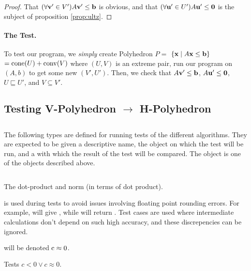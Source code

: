 \begin{proof}
That $(\forall \mathbf{v}'\in V')A\mathbf{v}'\leq\mathbf{b}$ is obvious, and that $(\forall\mathbf{u}'\in U') A\mathbf{u}'\leq\mathbf{0}$ is the subject of proposition \ref{prop:ultz}.
\end{proof}

\paragraph{The Test.}  To test our program, we \textit{simply} create Polyhedron $P =$ $\left\{\mathbf{x}\;|\; A\mathbf{x}\leq\mathbf{b}\right\}$ $= \operatorname{cone}(U) + \operatorname{conv}(V)$ where $(U,V)$ is an extreme pair, run our program on $(A,b)$ to get some new $(V',U')$.  Then, we check that $A\mathbf{v}' \leq \mathbf{b}$, $A\mathbf{u}'\leq\mathbf{0}$, $U\sqsubseteq U'$, and $V\subseteq V'$.

\subsection{Testing V-Polyhedron $\to$ H-Polyhedron}

\subsection{}

The following types are defined for running tests of the different algorithms.  They are expected to be given a descriptive name, the object on which the test will be run, and a  with which the result of the test will be compared.  The  object is one of the objects described above.
\lsthconetestcasea
\lstvconetestcasea
\lsthpolytestcaseb
\lstvpolytestcaseb

\subsection{}

The dot-product and norm (in terms of dot product).
\lstoperator
\lstnorm

 is used during tests to avoid issues involving floating point rounding errors.  For example,  will give , while  will return .  Test cases are used where intermediate calculations don't depend on such high accuracy, and these discrepencies can be ignored.

 will be denoted $\mli{c} \approx 0$.
\lstapproximatelyzeroa

Tests $c < 0 \lor c \approx 0$.
\lstapproximatelyltzero

